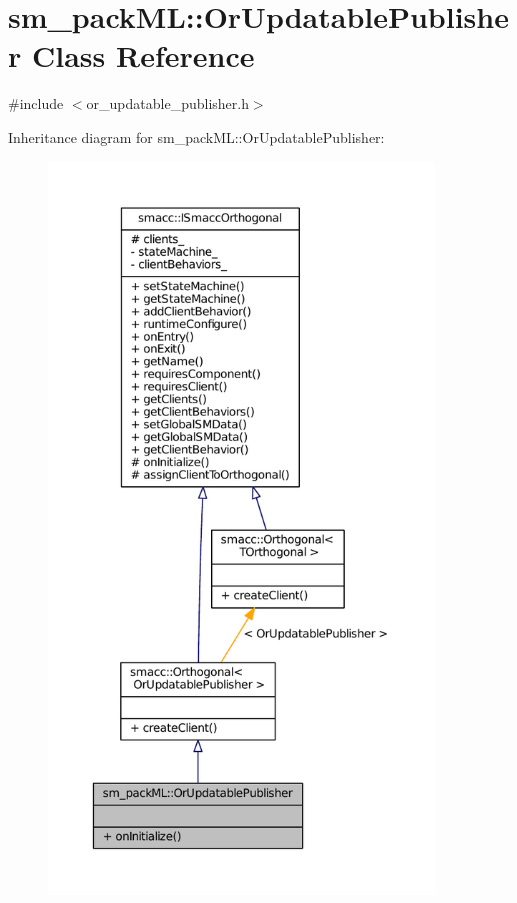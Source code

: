 \hypertarget{classsm__packML_1_1OrUpdatablePublisher}{}\section{sm\+\_\+pack\+ML\+:\+:Or\+Updatable\+Publisher Class Reference}
\label{classsm__packML_1_1OrUpdatablePublisher}


{\ttfamily \#include $<$or\+\_\+updatable\+\_\+publisher.\+h$>$}



Inheritance diagram for sm\+\_\+pack\+ML\+:\+:Or\+Updatable\+Publisher\+:
\nopagebreak
\begin{figure}[H]
\begin{center}
\leavevmode
\includegraphics[height=550pt]{classsm__packML_1_1OrUpdatablePublisher__inherit__graph}
\end{center}
\end{figure}


